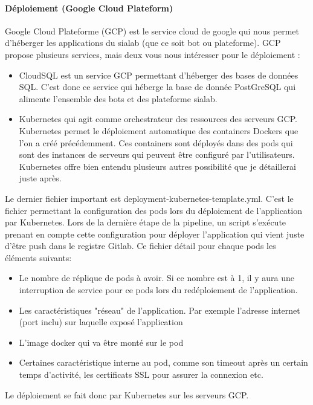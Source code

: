 \documentclass{article} %
\begin{document}
\paragraph{Déploiement (Google Cloud Plateform)\\}

Google Cloud Plateforme (GCP) est le service cloud de google qui nous permet d'héberger les applications du sialab (que ce soit bot ou plateforme). GCP propose plusieurs services, mais deux vous nous intéresser pour le déploiement :
\begin{itemize}
	\item CloudSQL est un service GCP permettant d'héberger des bases de données SQL. C'est donc ce service qui héberge la base de donnée PostGreSQL qui alimente l'ensemble des bots et des plateforme sialab.
	\item Kubernetes qui agit comme orchestrateur des ressources des serveurs GCP. Kubernetes permet le déploiement automatique des containers Dockers que l'on a créé précédemment. Ces containers sont déployés dans des pods qui sont des instances de serveurs qui peuvent être configuré par l'utilisateurs. Kubernetes offre bien entendu plusieurs autres possibilité que je détaillerai juste après. 
\end{itemize}

Le dernier fichier important est deployment-kubernetes-template.yml. C'est le fichier permettant la configuration des pods lors du déploiement de l'application par Kubernetes. Lors de la dernière étape de la pipeline, un script s'exécute prenant en compte cette configuration pour déployer l'application qui vient juste d'être push dans le registre Gitlab. Ce fichier détail pour chaque pods les éléments suivants:
\begin{itemize}
	\item Le nombre de réplique de pods à avoir. Si ce nombre est à 1, il y aura une interruption de service pour ce pods lors du redéploiement de l'application.
	\item Les caractéristiques "réseau" de l'application. Par exemple l'adresse internet (port inclu) sur laquelle exposé l'application
	\item L'image docker qui va être monté sur le pod
	\item Certaines caractéristique interne au pod, comme son timeout après un certain temps d'activité, les certificats SSL pour assurer la connexion etc.
\end{itemize}

Le déploiement se fait donc par Kubernetes sur les serveurs GCP.\\
\end{document}
